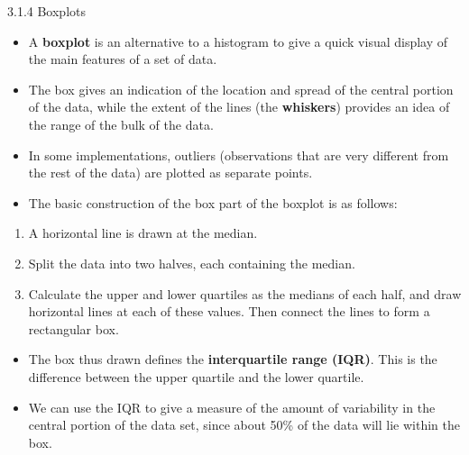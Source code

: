 \documentclass[
  9pt,
  a4paper,
  ignorenonframetext,
  notheorems]{beamer}
\providecommand{\tightlist}{%
  \setlength{\itemsep}{0pt}\setlength{\parskip}{0pt}}\usepackage{longtable,booktabs,array}
\begin{document}
\begin{frame}{3.1.4 Boxplots}
\protect\hypertarget{boxplots}{}
\begin{itemize}
\tightlist
\item
  A \textbf{boxplot} is an alternative to a histogram to give a quick
  visual display of the main features of a set of data.
\end{itemize}

\begin{itemize}
\item
  The box gives an indication of the location and spread of the central
  portion of the data, while the extent of the lines (the
  \textbf{whiskers}) provides an idea of the range of the bulk of the
  data.
\item
  In some implementations, outliers (observations that are very
  different from the rest of the data) are plotted as separate points.
\item
  The basic construction of the box part of the boxplot is as follows:
\end{itemize}

\begin{enumerate}
\tightlist
\item
  A horizontal line is drawn at the median.
\item
  Split the data into two halves, each containing the median.
\item
  Calculate the upper and lower quartiles as the medians of each half,
  and draw horizontal lines at each of these values. Then connect the
  lines to form a rectangular box.
\end{enumerate}

\begin{itemize}
\item
  The box thus drawn defines the \textbf{interquartile range (IQR)}.
  This is the difference between the upper quartile and the lower
  quartile.
\item
  We can use the IQR to give a measure of the amount of variability in
  the central portion of the data set, since about 50\% of the data will
  lie within the box.
\end{itemize}
\end{frame}
\end{document}
